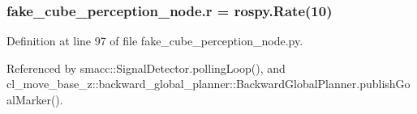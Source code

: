\subsubsection[{\texorpdfstring{r}{r}}]{\setlength{\rightskip}{0pt plus 5cm}fake\+\_\+cube\+\_\+perception\+\_\+node.\+r = rospy.\+Rate(10)}\hypertarget{namespacefake__cube__perception__node_a36e88703ab69fd35065e8a8d9344903e}{}\label{namespacefake__cube__perception__node_a36e88703ab69fd35065e8a8d9344903e}


Definition at line 97 of file fake\+\_\+cube\+\_\+perception\+\_\+node.\+py.



Referenced by smacc\+::\+Signal\+Detector.\+polling\+Loop(), and cl\+\_\+move\+\_\+base\+\_\+z\+::backward\+\_\+global\+\_\+planner\+::\+Backward\+Global\+Planner.\+publish\+Goal\+Marker().

